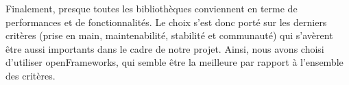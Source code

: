 Finalement, presque toutes les bibliothèques conviennent en terme de performances et de fonctionnalités. Le choix s'est donc porté sur les derniers critères (prise en main, maintenabilité, stabilité et communauté) qui s'avèrent être aussi importants dans le cadre de notre projet. Ainsi, nous avons choisi d'utiliser openFrameworks, qui semble être la meilleure par rapport à l'ensemble des critères.  
